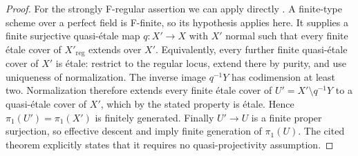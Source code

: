 \begin{proof}
For the strongly F-regular assertion we can apply directly
\cite[Corollary 4.2, arXiv p.~6]{BCGST2019D}. A finite-type scheme
over a perfect field is F-finite, so its hypothesis applies here.
It supplies a finite surjective quasi-\'etale map
$q:X'\to X$ with $X'$ normal such that every finite \'etale cover
of $X'_{\mathrm{reg}}$ extends over $X'$. Equivalently, every
further finite quasi-\'etale cover of $X'$ is \'etale: restrict to
the regular locus, extend there by purity, and use uniqueness of
normalization. The inverse image $q^{-1}Y$ has codimension at
least two. Normalization therefore extends every finite \'etale
cover of $U'=X'\setminus q^{-1}Y$ to a quasi-\'etale cover of
$X'$, which by the stated property is \'etale. Hence
$\pi_1(U')=\pi_1(X')$ is finitely generated. Finally
$U'\to U$ is a finite proper surjection, so effective descent and
\cite[IX, Corollary 5.2]{SGA1} imply finite generation of
$\pi_1(U)$. The cited theorem explicitly states that it requires
no quasi-projectivity assumption.
\end{proof}

